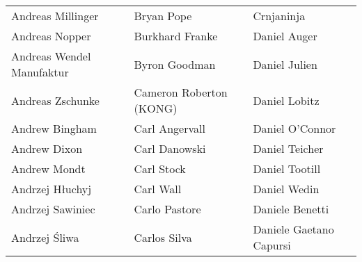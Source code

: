 \begin{tabular}{p{4.5cm}p{4.5cm}p{4.5cm}}
Andreas Millinger & Bryan Pope & Crnjaninja \\
Andreas Nopper & Burkhard Franke & Daniel Auger \\
Andreas Wendel Manufaktur & Byron Goodman & Daniel Julien \\
Andreas Zschunke & Cameron Roberton (KONG) & Daniel Lobitz \\
Andrew Bingham & Carl Angervall & Daniel O'Connor \\
Andrew Dixon & Carl Danowski & Daniel Teicher \\
Andrew Mondt & Carl Stock & Daniel Tootill \\
Andrzej Hłuchyj & Carl Wall & Daniel Wedin \\
Andrzej Sawiniec & Carlo Pastore & Daniele Benetti \\
Andrzej Śliwa & Carlos Silva & Daniele Gaetano Capursi \\
\end{tabular}
\newpage
\setlength{\tabcolsep}{1mm}
